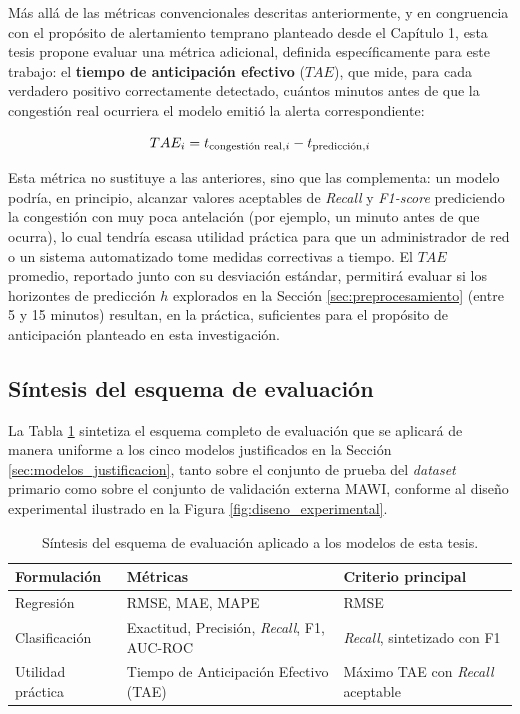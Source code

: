 \documentclass[12pt]{report}
\begin{document}
Más allá de las métricas convencionales descritas anteriormente, y en congruencia con el propósito de alertamiento temprano planteado desde el Capítulo 1, esta tesis propone evaluar una métrica adicional, definida específicamente para este trabajo: el \textbf{tiempo de anticipación efectivo} ($TAE$), que mide, para cada verdadero positivo correctamente detectado, cuántos minutos antes de que la congestión real ocurriera el modelo emitió la alerta correspondiente:

\begin{equation}
    TAE_i = t_{\mbox{\scriptsize congestión real}, i} - t_{\mbox{\scriptsize predicción}, i}
    \label{eq:tae}
\end{equation}

Esta métrica no sustituye a las anteriores, sino que las complementa: un modelo podría, en principio, alcanzar valores aceptables de \textit{Recall} y \textit{F1-score} prediciendo la congestión con muy poca antelación (por ejemplo, un minuto antes de que ocurra), lo cual tendría escasa utilidad práctica para que un administrador de red o un sistema automatizado tome medidas correctivas a tiempo. El $TAE$ promedio, reportado junto con su desviación estándar, permitirá evaluar si los horizontes de predicción $h$ explorados en la Sección 
\ref{sec:preprocesamiento} (entre 5 y 15 minutos) resultan, en la práctica, suficientes para el propósito de anticipación planteado en esta investigación.

\subsection*{Síntesis del esquema de evaluación}

La Tabla \ref{tab:resumen_evaluacion} sintetiza el esquema completo de evaluación que se aplicará de manera uniforme a los cinco modelos justificados en la Sección \ref{sec:modelos_justificacion}, tanto sobre el conjunto de prueba del \textit{dataset} primario como sobre el conjunto de validación externa MAWI, conforme al diseño experimental ilustrado en la Figura \ref{fig:diseno_experimental}.

\begin{table}[H]
    \centering
    \begin{tabular}{|l|p{6cm}|l|}
        \hline
        \textbf{Formulación} & \textbf{Métricas} & \textbf{Criterio principal} \\
        \hline
        Regresión & RMSE, MAE, MAPE & RMSE \\
        \hline
        Clasificación & Exactitud, Precisión, \textit{Recall}, F1, AUC-ROC & \textit{Recall}, sintetizado con F1 \\
        \hline
        Utilidad práctica & Tiempo de Anticipación Efectivo (TAE) & Máximo TAE con \textit{Recall} aceptable \\
        \hline
    \end{tabular}
    \caption{Síntesis del esquema de evaluación aplicado a los modelos de esta tesis.}
    \label{tab:resumen_evaluacion}
\end{table}
\end{document}
